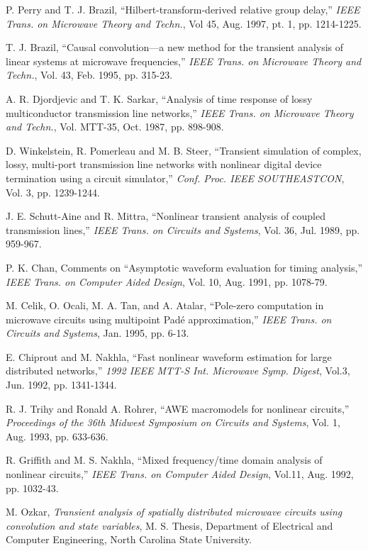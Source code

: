 \begin{thebibliography}{99}
 P. Perry and T. J. Brazil, ``Hilbert-transform-derived
relative group delay,'' \emph{IEEE Trans. on Microwave Theory
and Techn.}, Vol 45, Aug. 1997, pt. 1, pp. 1214-1225.

 T. J. Brazil, ``Causal convolution---a
new method for the transient analysis of linear systems at microwave
frequencies,'' \emph{IEEE Trans. on Microwave Theory and
Techn.}, Vol. 43, Feb. 1995, pp. 315-23.

 A. R. Djordjevic and T. K. Sarkar, ``Analysis of time
response of lossy multiconductor transmission line networks,''
\emph{IEEE Trans. on Microwave Theory and Techn.}, Vol. MTT-35,
Oct. 1987, pp. 898-908.

 D. Winkelstein, R. Pomerleau and M. B. Steer, ``Transient
simulation of complex, lossy, multi-port transmission line networks
with nonlinear digital device termination using a circuit simulator,''
\emph{Conf. Proc. IEEE SOUTHEASTCON}, Vol. 3, pp. 1239-1244.

 J. E. Schutt-Aine and R. Mittra, ``Nonlinear transient
analysis of coupled transmission lines,'' \emph{IEEE Trans. on Circuits
and Systems}, Vol. 36, Jul. 1989, pp. 959-967.

 P. K. Chan, Comments on ``Asymptotic waveform
evaluation for timing analysis,'' \emph{IEEE Trans. on Computer Aided
Design}, Vol. 10, Aug. 1991, pp. 1078-79.

 M. Celik, O. Ocali, M. A. Tan, and A. Atalar,
``Pole-zero computation in microwave circuits using multipoint Pad\'e
approximation,'' \emph{IEEE Trans. on Circuits and Systems},
Jan. 1995, pp. 6-13.

 E. Chiprout and M. Nakhla, ``Fast nonlinear
waveform estimation for large distributed networks,'' \emph{1992 IEEE
MTT-S Int. Microwave Symp. Digest}, Vol.3, Jun. 1992,
pp. 1341-1344.

 R. J. Trihy and Ronald A. Rohrer, ``AWE macromodels
for nonlinear circuits,'' \emph{Proceedings of the 36th Midwest
Symposium on Circuits and Systems}, Vol. 1, Aug. 1993, pp. 633-636.

 R. Griffith and M. S. Nakhla, ``Mixed frequency/time
domain analysis of nonlinear circuits,'' \emph{IEEE Trans. on Computer
Aided Design}, Vol.11, Aug. 1992, pp. 1032-43.

 M. Ozkar, \emph{Transient analysis of spatially distributed
microwave circuits using convolution and state variables},
M. S. Thesis, Department of Electrical and Computer Engineering,
North Carolina State University.


\end{thebibliography}
